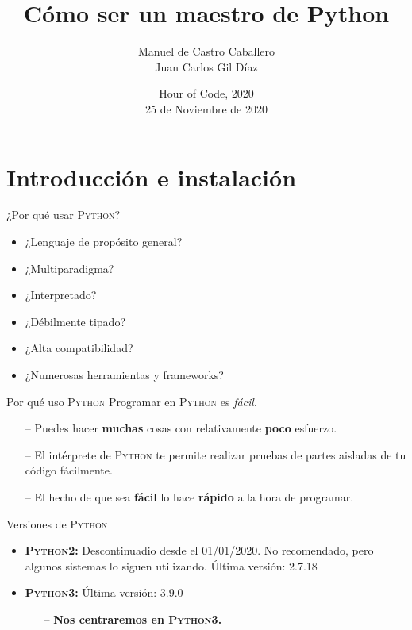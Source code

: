 \documentclass[10pt]{beamer} %
\title[Python]{Cómo ser un maestro de Python}
\institute[]
 {
   GUI\\
   Grupo Universitario de Informática\\
   Escuela de Ingeniería Informática, Universidad de Valladolid
 }
\author[]{Manuel de Castro Caballero \\ Juan Carlos Gil Díaz}
\date[HoC 2020]
 {Hour of Code, 2020\\
	25 de Noviembre de 2020}
\newcommand{\py}{\textsc{Python}}
\begin{document}
\begin{frame}{}
    \titlepage
\end{frame}

\section{Introducción e instalación}

\begin{frame}{¿Por qué usar \py?}
    \begin{itemize}
        \item ¿Lenguaje de propósito general?
        \item ¿Multiparadigma?
        \item ¿Interpretado?
        \item ¿Débilmente tipado?
        \item ¿Alta compatibilidad?
        \item ¿Numerosas herramientas y frameworks?
    \end{itemize}
\end{frame}

\begin{frame}{Por qué uso \py}
    Programar en \py{} es \textit{fácil}.
    \begin{itemize}
        \item[--] Puedes hacer \textbf{muchas} cosas con relativamente \textbf{poco} esfuerzo.
        \item[--] El intérprete de \textsc{Python} te permite realizar pruebas de partes aisladas de tu código fácilmente.
        \item[--] El hecho de que sea \textbf{fácil} lo hace \textbf{rápido} a la hora de programar.
    \end{itemize}
\end{frame}

\begin{frame}{Versiones de \py}
    \begin{itemize}
        \item \textbf{\py 2: } Descontinuadio desde el 01/01/2020. No recomendado, pero algunos sistemas lo siguen utilizando. Última versión: 2.7.18
        \item \textbf{\py 3: } Última versión: 3.9.0
        \begin{itemize}
            \item[--] \textbf{Nos centraremos en \py 3.}
        \end{itemize}
    \end{itemize}
\end{frame}
\end{document}
